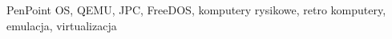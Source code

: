\documentclass[
    bindingoffset=5mm,  %
    footnoteindent=3mm, %
    hyphenation=true    %
]{src/wut-thesis}
\begin{document}
\secondkeywords
PenPoint OS, QEMU, JPC, FreeDOS, komputery rysikowe, retro komputery, emulacja,
virtualizacja

\pagestyle{plain}

\cleardoublepage %
\tableofcontents

\cleardoublepage %
\pagestyle{headings}






%

\cleardoublepage %
\printbibliography
\clearpage

\vspace{0.8cm}

\pagestyle{plain}

\listoffigurestoc    %


\captionsetup[figure]{list=no}
\captionsetup[table]{list=no}

%

\end{document}
